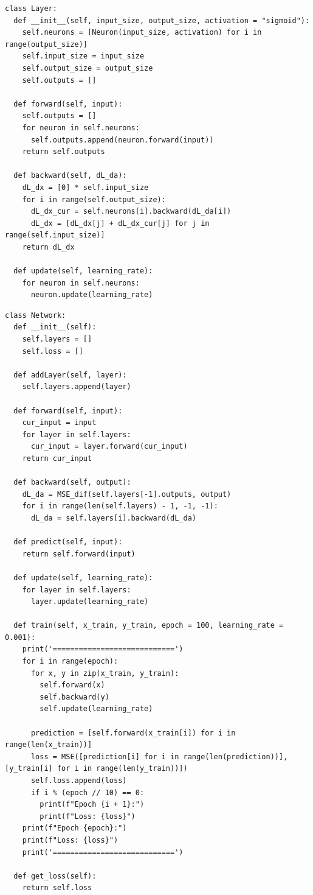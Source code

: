 \documentclass[12pt,a4paper]{article}
\begin{document}
\begin{lstlisting}[caption={Класс слоя}, label={lst:code_example}]
class Layer:
  def __init__(self, input_size, output_size, activation = "sigmoid"):
    self.neurons = [Neuron(input_size, activation) for i in range(output_size)]
    self.input_size = input_size
    self.output_size = output_size
    self.outputs = []

  def forward(self, input):
    self.outputs = []
    for neuron in self.neurons:
      self.outputs.append(neuron.forward(input))
    return self.outputs

  def backward(self, dL_da):
    dL_dx = [0] * self.input_size
    for i in range(self.output_size):
      dL_dx_cur = self.neurons[i].backward(dL_da[i])
      dL_dx = [dL_dx[j] + dL_dx_cur[j] for j in range(self.input_size)]
    return dL_dx

  def update(self, learning_rate):
    for neuron in self.neurons:
      neuron.update(learning_rate)

\end{lstlisting}

\begin{lstlisting}[caption={Класс сети}, label={lst:code_example}]
class Network:
  def __init__(self):
    self.layers = []
    self.loss = []

  def addLayer(self, layer):
    self.layers.append(layer)

  def forward(self, input):
    cur_input = input
    for layer in self.layers:
      cur_input = layer.forward(cur_input)
    return cur_input

  def backward(self, output):
    dL_da = MSE_dif(self.layers[-1].outputs, output)
    for i in range(len(self.layers) - 1, -1, -1):
      dL_da = self.layers[i].backward(dL_da)

  def predict(self, input):
    return self.forward(input)

  def update(self, learning_rate):
    for layer in self.layers:
      layer.update(learning_rate)

  def train(self, x_train, y_train, epoch = 100, learning_rate = 0.001):
    print('============================')
    for i in range(epoch):
      for x, y in zip(x_train, y_train):
        self.forward(x)
        self.backward(y)
        self.update(learning_rate)

      prediction = [self.forward(x_train[i]) for i in range(len(x_train))]
      loss = MSE([prediction[i] for i in range(len(prediction))], [y_train[i] for i in range(len(y_train))])
      self.loss.append(loss)
      if i % (epoch // 10) == 0:
        print(f"Epoch {i + 1}:")
        print(f"Loss: {loss}")
    print(f"Epoch {epoch}:")
    print(f"Loss: {loss}")
    print('============================')

  def get_loss(self):
    return self.loss

\end{lstlisting}
\end{document}
